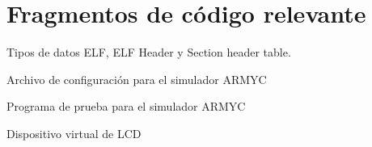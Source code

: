 \chapter{Fragmentos de c\'odigo relevante}\label{ch:codigo}

Tipos de datos ELF, ELF Header y Section header table.



\pagebreak

Archivo de configuración para el simulador ARMYC



\pagebreak

Programa de prueba para el simulador ARMYC



\pagebreak

Dispositivo virtual de LCD



\pagebreak



